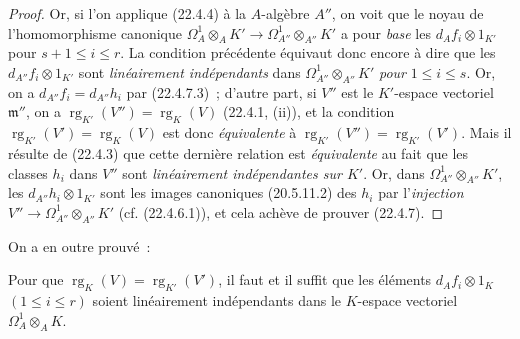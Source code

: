 \begin{proof}
Or, si l'on applique (22.4.4) à la $A$-algèbre $A''$, on voit que le noyau de
l'homomorphisme canonique
$\Omega^1_A\otimes_AK'\longrightarrow\Omega^1_{A''}\otimes_{A''}K'$ a pour
\emph{base} les $d_Af_i\otimes1_{K'}$ pour $s+1\leqslant i\leqslant r$. La condition
précédente équivaut donc encore à dire que les $d_{A''}f_i\otimes1_{K'}$ sont
\emph{linéairement indépendants} dans $\Omega^1_{A''}\otimes_{A''}K'$ \emph{pour}
$1\leqslant i\leqslant s$. Or, on a $d_{A''}f_i=d_{A''}h_i$ par (22.4.7.3)~;
d'autre part, si $V''$ est le $K'$-espace vectoriel $\mathfrak m''$, on a
$\operatorname{rg}_{K'}(V'')=\operatorname{rg}_K(V)$ (22.4.1, (ii)), et la condition
$\operatorname{rg}_{K'}(V')=\operatorname{rg}_K(V)$ est donc \emph{équivalente} à
$\operatorname{rg}_{K'}(V'')=\operatorname{rg}_{K'}(V')$. Mais il résulte de (22.4.3) que cette dernière
relation est \emph{équivalente} au fait que les classes $h_i$
dans $V''$ sont \emph{linéairement indépendantes sur $K'$}. Or, dans
$\Omega^1_{A''}\otimes_{A''}K'$, les $d_{A''}h_i\otimes1_{K'}$ sont les images
canoniques (20.5.11.2) des $h_i$ par l'\emph{injection}
$V''\longrightarrow\Omega^1_{A''}\otimes_{A''}K'$ (cf. (22.4.6.1)), et cela
achève de prouver (22.4.7).
\end{proof}

On a en outre prouvé~:

\begin{corollary}[22.4.7.4]
\label{0.22.4.7.4-fr}
Pour que $\operatorname{rg}_K(V)=\operatorname{rg}_{K'}(V')$, il faut et il suffit que les éléments
$d_Af_i\otimes1_K$ $(1\leqslant i\leqslant r)$ soient linéairement
indépendants dans le $K$-espace vectoriel $\Omega^1_A\otimes_AK$.
\end{corollary}

